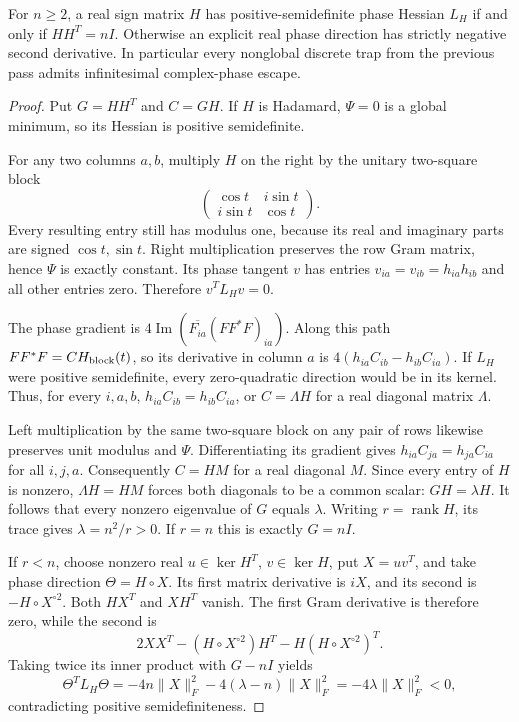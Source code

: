 \begin{theorem}
For $n\ge2$, a real sign matrix $H$ has positive-semidefinite
phase Hessian $L_H$ if and only if $HH^T=nI$.
Otherwise an explicit real phase direction has strictly negative
second derivative. In particular every nonglobal discrete trap
from the previous pass admits infinitesimal complex-phase escape.
\end{theorem}
\begin{proof}
Put $G=HH^T$ and $C=GH$. If $H$ is Hadamard, $\Psi=0$ is a global
minimum, so its Hessian is positive semidefinite.

For any two columns $a,b$, multiply $H$ on the right by the unitary
two-square block
\[
 \begin{pmatrix}\cos t&i\sin t\\i\sin t&\cos t\end{pmatrix}.
\]
Every resulting entry still has modulus one, because its real and
imaginary parts are signed $\cos t,\sin t$. Right multiplication
preserves the row Gram matrix, hence $\Psi$ is exactly constant.
Its phase tangent $v$ has entries
$v_{ia}=v_{ib}=h_{ia}h_{ib}$ and all other entries zero.
Therefore $v^TL_Hv=0$.

The phase gradient is
$4\operatorname{Im}(\overline{F_{ia}}(FF^*F)_{ia})$.
Along this path $FF^*F=CH_{\rm block}(t)$, so its derivative in
column $a$ is $4(h_{ia}C_{ib}-h_{ib}C_{ia})$.
If $L_H$ were positive semidefinite, every zero-quadratic direction
would be in its kernel. Thus, for every $i,a,b$,
$h_{ia}C_{ib}=h_{ib}C_{ia}$, or $C=\Lambda H$ for a real diagonal
matrix $\Lambda$.

Left multiplication by the same two-square block on any pair of
rows likewise preserves unit modulus and $\Psi$. Differentiating
its gradient gives $h_{ia}C_{ja}=h_{ja}C_{ia}$ for all $i,j,a$.
Consequently $C=H M$ for a real diagonal $M$. Since every entry of
$H$ is nonzero, $\Lambda H=HM$ forces both diagonals to be a
common scalar: $GH=\lambda H$.
It follows that every nonzero eigenvalue of $G$ equals $\lambda$.
Writing $r=\operatorname{rank}H$, its trace gives $\lambda=n^2/r>0$.
If $r=n$ this is exactly $G=nI$.

If $r<n$, choose nonzero real $u\in\ker H^T$, $v\in\ker H$,
put $X=uv^T$, and take phase direction $\Theta=H\circ X$.
Its first matrix derivative is $iX$, and its second is
$-H\circ X^{\circ2}$. Both $HX^T$ and $XH^T$ vanish.
The first Gram derivative is therefore zero, while the second is
\[
 2XX^T-(H\circ X^{\circ2})H^T
       -H(H\circ X^{\circ2})^T.
\]
Taking twice its inner product with $G-nI$ yields
\[
 \Theta^TL_H\Theta
 =-4n\|X\|_F^2-4(\lambda-n)\|X\|_F^2
 =-4\lambda\|X\|_F^2<0,
\]
contradicting positive semidefiniteness.
\end{proof}

